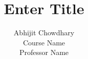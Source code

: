 \documentclass[12pt]{article}
\begin{document}
 

 
\title{Enter Title}%
\author{Abhijit Chowdhary\\ %
Course Name\\
Professor Name} %
 
\maketitle
\end{document}
